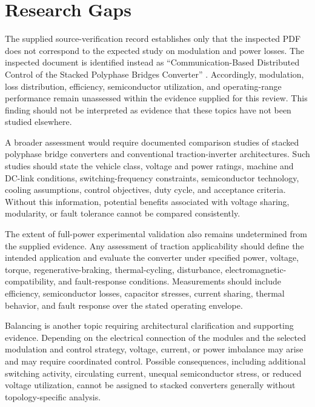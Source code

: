 \section{Research Gaps}

The supplied source-verification record establishes only that the inspected PDF does not correspond to the expected study on modulation and power losses. The inspected document is identified instead as ``Communication-Based Distributed Control of the Stacked Polyphase Bridges Converter'' \cite{Jin2017}. Accordingly, modulation, loss distribution, efficiency, semiconductor utilization, and operating-range performance remain unassessed within the evidence supplied for this review. This finding should not be interpreted as evidence that these topics have not been studied elsewhere. %

A broader assessment would require documented comparison studies of stacked polyphase bridge converters and conventional traction-inverter architectures. Such studies should state the vehicle class, voltage and power ratings, machine and DC-link conditions, switching-frequency constraints, semiconductor technology, cooling assumptions, control objectives, duty cycle, and acceptance criteria. Without this information, potential benefits associated with voltage sharing, modularity, or fault tolerance cannot be compared consistently. %

The extent of full-power experimental validation also remains undetermined from the supplied evidence. Any assessment of traction applicability should define the intended application and evaluate the converter under specified power, voltage, torque, regenerative-braking, thermal-cycling, disturbance, electromagnetic-compatibility, and fault-response conditions. Measurements should include efficiency, semiconductor losses, capacitor stresses, current sharing, thermal behavior, and fault response over the stated operating envelope. %

Balancing is another topic requiring architectural clarification and supporting evidence. Depending on the electrical connection of the modules and the selected modulation and control strategy, voltage, current, or power imbalance may arise and may require coordinated control. Possible consequences, including additional switching activity, circulating current, unequal semiconductor stress, or reduced voltage utilization, cannot be assigned to stacked converters generally without topology-specific analysis. %

